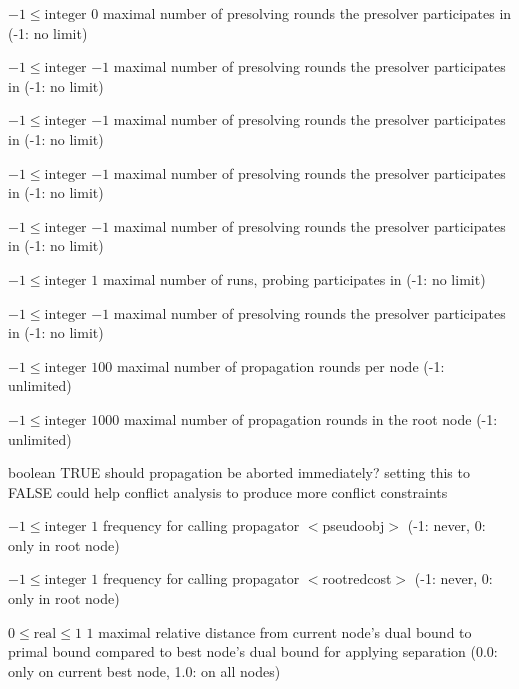 %
{$-1\leq\textrm{integer}$}%
{$0$}%
{maximal number of presolving rounds the presolver participates in (-1: no limit)}%
{}

%
{$-1\leq\textrm{integer}$}%
{$-1$}%
{maximal number of presolving rounds the presolver participates in (-1: no limit)}%
{}

%
{$-1\leq\textrm{integer}$}%
{$-1$}%
{maximal number of presolving rounds the presolver participates in (-1: no limit)}%
{}

%
{$-1\leq\textrm{integer}$}%
{$-1$}%
{maximal number of presolving rounds the presolver participates in (-1: no limit)}%
{}

%
{$-1\leq\textrm{integer}$}%
{$-1$}%
{maximal number of presolving rounds the presolver participates in (-1: no limit)}%
{}

%
{$-1\leq\textrm{integer}$}%
{$1$}%
{maximal number of runs, probing participates in (-1: no limit)}%
{}

%
{$-1\leq\textrm{integer}$}%
{$-1$}%
{maximal number of presolving rounds the presolver participates in (-1: no limit)}%
{}

%
{$-1\leq\textrm{integer}$}%
{$100$}%
{maximal number of propagation rounds per node (-1: unlimited)}%
{}

%
{$-1\leq\textrm{integer}$}%
{$1000$}%
{maximal number of propagation rounds in the root node (-1: unlimited)}%
{}

%
{boolean}%
{TRUE}%
{should propagation be aborted immediately? setting this to FALSE could help conflict analysis to produce more conflict constraints}%
{}

%
{$-1\leq\textrm{integer}$}%
{$1$}%
{frequency for calling propagator $<$pseudoobj$>$ (-1: never, 0: only in root node)}%
{}

%
{$-1\leq\textrm{integer}$}%
{$1$}%
{frequency for calling propagator $<$rootredcost$>$ (-1: never, 0: only in root node)}%
{}

%
{$0\leq\textrm{real}\leq1$}%
{$1$}%
{maximal relative distance from current node's dual bound to primal bound compared to best node's dual bound for applying separation (0.0: only on current best node, 1.0: on all nodes)}%
{}

